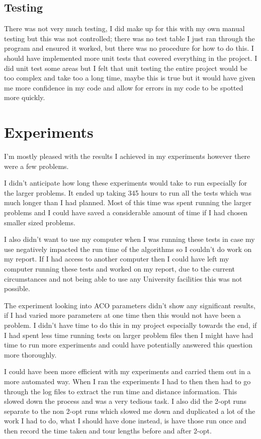 \subsection{Testing}
 
There was not very much testing, I did make up for this with my own manual testing but this was not controlled; there was no test table I just ran through the program and ensured it worked, but there was no procedure for how to do this. I should have implemented more unit tests that covered everything in the project. I did unit test some areas but I felt that unit testing the entire project would be too complex and take too a long time, maybe this is true but it would have given me more confidence in my code and allow for errors in my code to be spotted more quickly.

\section{Experiments}

I'm mostly pleased with the results I achieved in my experiments however there were a few problems.

I didn't anticipate how long these experiments would take to run especially for the larger problems. It ended up taking 345 hours to run all the tests which was much longer than I had planned. Most of this time was spent running the larger problems and I could have saved a considerable amount of time if I had chosen smaller sized problems.

I also didn't want to use my computer when I was running these tests in case my use negatively impacted the run time of the algorithms so I couldn't do work on my report. If I had access to another computer then I could have left my computer running these tests and worked on my report, due to the current circumstances and not being able to use any University facilities this was not possible.

The experiment looking into ACO parameters didn't show any significant results, if I had varied more parameters at one time then this would not have been a problem. I didn't have time to do this in my project especially towards the end, if I had spent less time running tests on larger problem files then I might have had time to run more experiments and could have potentially answered this question more thoroughly.

I could have been more efficient with my experiments and carried them out in a more automated way. When I ran the experiments I had to then then had to go through the log files to extract the run time and distance information. This slowed down the process and was a very tedious task. I also did the 2-opt runs separate to the non 2-opt runs which slowed me down and duplicated a lot of the work I had to do, what I should have done instead, is have those run once and then record the time taken and tour lengths before and after 2-opt.

